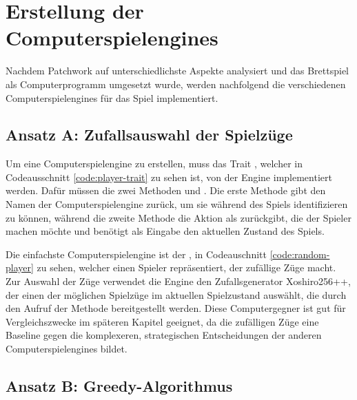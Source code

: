 \chapter{Erstellung der Computerspielengines}
\label{chapter:erstellung-der-computerspielengines}

Nachdem Patchwork auf unterschiedlichste Aspekte analysiert und das Brettspiel als Computerprogramm umgesetzt wurde, werden nachfolgend die verschiedenen Computerspielengines für das Spiel implementiert.

\section{Ansatz A: Zufallsauswahl der Spielzüge}
\label{section:erstellung-ansatz-a}

Um eine Computerspielengine zu erstellen, muss das Trait , welcher in Codeausschnitt \ref{code:player-trait} zu sehen ist, von der Engine implementiert werden. Dafür müssen die zwei Methoden  und . Die erste Methode gibt den Namen der Computerspielengine zurück, um sie während des Spiels identifizieren zu können, während die zweite Methode die Aktion als  zurückgibt, die der Spieler machen möchte und benötigt als Eingabe den aktuellen Zustand des Spiels.



Die einfachste Computerspielengine ist der , in Codeauschnitt \ref{code:random-player} zu sehen, welcher einen Spieler repräsentiert, der zufällige Züge macht. Zur Auswahl der Züge verwendet die Engine den Zufallsgenerator Xoshiro256++, der einen der möglichen Spielzüge im aktuellen Spielzustand  auswählt, die durch den Aufruf der Methode  bereitgestellt werden. Diese Computergegner ist gut für Vergleichszwecke im späteren Kapitel  geeignet, da die zufälligen Züge eine Baseline gegen die komplexeren, strategischen Entscheidungen der anderen Computerspielengines bildet.



\pagebreak

\section{Ansatz B: Greedy-Algorithmus}

